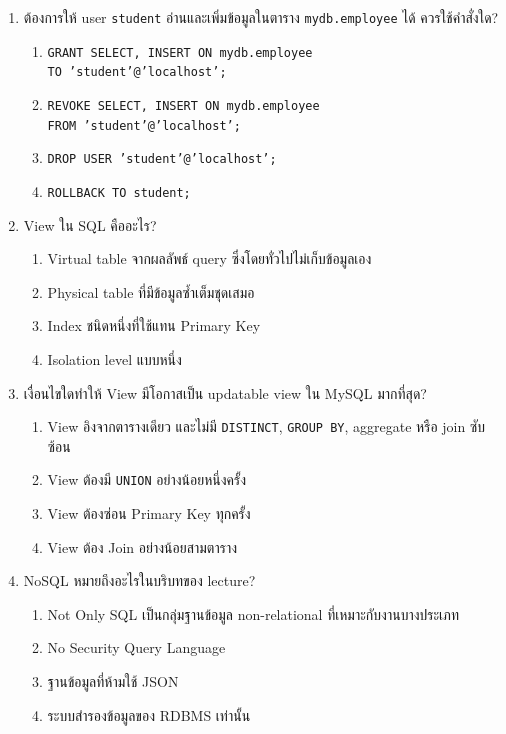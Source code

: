\documentclass[a4paper,12pt]{article}
\begin{document}
\begin{enumerate}[label=\textbf{\arabic*.}]
    \item ต้องการให้ user \texttt{student} อ่านและเพิ่มข้อมูลในตาราง \texttt{mydb.employee} ได้ ควรใช้คำสั่งใด?
    \begin{enumerate}[label=\alph*.]
        \item \texttt{GRANT SELECT, INSERT ON mydb.employee}\\
        \texttt{TO 'student'@'localhost';}
        \item \texttt{REVOKE SELECT, INSERT ON mydb.employee}\\
        \texttt{FROM 'student'@'localhost';}
        \item \texttt{DROP USER 'student'@'localhost';}
        \item \texttt{ROLLBACK TO student;}
    \end{enumerate}

    \item View ใน SQL คืออะไร?
    \begin{enumerate}[label=\alph*.]
        \item Virtual table จากผลลัพธ์ query ซึ่งโดยทั่วไปไม่เก็บข้อมูลเอง
        \item Physical table ที่มีข้อมูลซ้ำเต็มชุดเสมอ
        \item Index ชนิดหนึ่งที่ใช้แทน Primary Key
        \item Isolation level แบบหนึ่ง
    \end{enumerate}

    \item เงื่อนไขใดทำให้ View มีโอกาสเป็น updatable view ใน MySQL มากที่สุด?
    \begin{enumerate}[label=\alph*.]
        \item View อิงจากตารางเดียว และไม่มี \texttt{DISTINCT}, \texttt{GROUP BY}, aggregate หรือ join ซับซ้อน
        \item View ต้องมี \texttt{UNION} อย่างน้อยหนึ่งครั้ง
        \item View ต้องซ่อน Primary Key ทุกครั้ง
        \item View ต้อง Join อย่างน้อยสามตาราง
    \end{enumerate}

    \item NoSQL หมายถึงอะไรในบริบทของ lecture?
    \begin{enumerate}[label=\alph*.]
        \item Not Only SQL เป็นกลุ่มฐานข้อมูล non-relational ที่เหมาะกับงานบางประเภท
        \item No Security Query Language
        \item ฐานข้อมูลที่ห้ามใช้ JSON
        \item ระบบสำรองข้อมูลของ RDBMS เท่านั้น
    \end{enumerate}


\end{enumerate}
\end{document}

